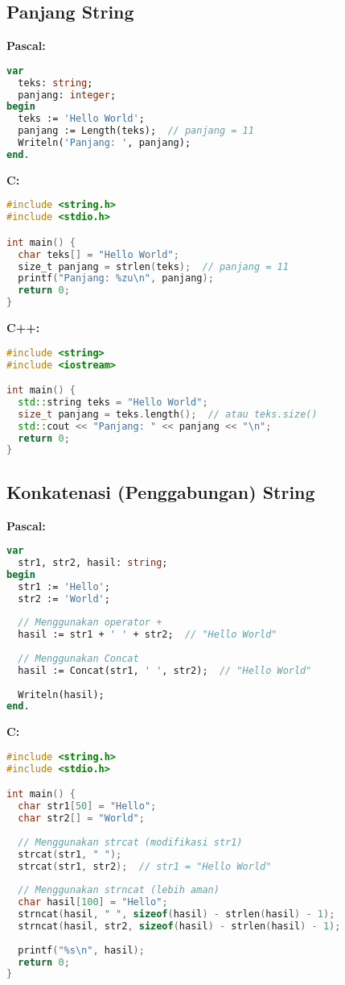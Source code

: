 \documentclass[../main.tex]{subfiles}
\begin{document}
\subsection{Panjang String}

\textbf{Pascal:}
\begin{lstlisting}[language=Pascal, caption={Panjang string di Pascal}]
var
  teks: string;
  panjang: integer;
begin
  teks := 'Hello World';
  panjang := Length(teks);  // panjang = 11
  Writeln('Panjang: ', panjang);
end.
\end{lstlisting}

\textbf{C:}
\begin{lstlisting}[language=C, caption={Panjang string di C}]
#include <string.h>
#include <stdio.h>

int main() {
  char teks[] = "Hello World";
  size_t panjang = strlen(teks);  // panjang = 11
  printf("Panjang: %zu\n", panjang);
  return 0;
}
\end{lstlisting}

\textbf{C++:}
\begin{lstlisting}[language=C++, caption={Panjang string di C++}]
#include <string>
#include <iostream>

int main() {
  std::string teks = "Hello World";
  size_t panjang = teks.length();  // atau teks.size()
  std::cout << "Panjang: " << panjang << "\n";
  return 0;
}
\end{lstlisting}

\subsection{Konkatenasi (Penggabungan) String}

\textbf{Pascal:}
\begin{lstlisting}[language=Pascal, caption={Konkatenasi di Pascal}]
var
  str1, str2, hasil: string;
begin
  str1 := 'Hello';
  str2 := 'World';
  
  // Menggunakan operator +
  hasil := str1 + ' ' + str2;  // "Hello World"
  
  // Menggunakan Concat
  hasil := Concat(str1, ' ', str2);  // "Hello World"
  
  Writeln(hasil);
end.
\end{lstlisting}

\textbf{C:}
\begin{lstlisting}[language=C, caption={Konkatenasi di C}]
#include <string.h>
#include <stdio.h>

int main() {
  char str1[50] = "Hello";
  char str2[] = "World";
  
  // Menggunakan strcat (modifikasi str1)
  strcat(str1, " ");
  strcat(str1, str2);  // str1 = "Hello World"
  
  // Menggunakan strncat (lebih aman)
  char hasil[100] = "Hello";
  strncat(hasil, " ", sizeof(hasil) - strlen(hasil) - 1);
  strncat(hasil, str2, sizeof(hasil) - strlen(hasil) - 1);
  
  printf("%s\n", hasil);
  return 0;
}
\end{lstlisting}
\end{document}

